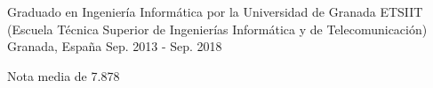 

\begin{cventries}

  \cventry
    {Graduado en Ingeniería Informática por la Universidad de Granada} %
    {ETSIIT (Escuela Técnica Superior de Ingenierías Informática y de Telecomunicación)} %
    {Granada, España} %
    {Sep. 2013 - Sep. 2018} %
    {
      \begin{cvitems} %
        \item {Nota media de 7.878}
      \end{cvitems}
    }

\end{cventries}
